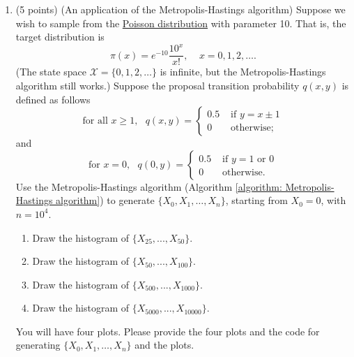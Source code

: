 \documentclass[11pt,letterpaper, leqno]{article}
\numberwithin{equation}{section}
\numberwithin{theorem}{section}
\numberwithin{lemma}{section}
\numberwithin{corollary}{section}
\numberwithin{definition}{section}
\numberwithin{proposition}{section}
\numberwithin{remark}{section}
\numberwithin{example}{section}
\begin{document}
\begin{enumerate}

\item (5 points) (An application of the Metropolis-Hastings algorithm) Suppose we wish to sample from the \href{https://en.wikipedia.org/wiki/Poisson_distribution}{Poisson distribution} with parameter 10. That is, the target distribution is
 $$
\pi(x) = e^{-10} \frac{10^x}{x!},~~~~~x=0,1,2,\ldots.
$$
(The state space $\mathcal{X}=\{0,1,2,\ldots\}$ is infinite, but the Metropolis-Hastings algorithm still works.) Suppose the proposal transition
probability $q(x,y)$ is defined as follows
$$
\mbox{for all }x\ge1,\ \ \ q(x,y) = \left\{\begin{array}{cl}  0.5 &  \mbox{ if }y = x \pm 1\\ 
0 & \mbox{ otherwise;}\end{array}\right.
$$
and
$$
\mbox{for }x=0,\ \ \ q(0,y) = \left\{\begin{array}{cl}  0.5 &  \mbox{ if }y = 1 \mbox{ or } 0\\ 
0 & \mbox{ otherwise.}\end{array}\right.
$$
Use the Metropolis-Hastings algorithm (Algorithm \ref{algorithm: Metropolis-Hastings algorithm}) to generate $\{X_0,X_1, \ldots,X_n\}$,
starting from $X_0 = 0$, with $n = 10^4$. 

\begin{enumerate}
    \item Draw the histogram of $\{X_{25}, . . . ,X_{50}\}$.
    \item Draw the histogram of $\{X_{50}, . . . ,X_{100}\}$.
    \item Draw the histogram of $\{X_{500}, . . . ,X_{1000}\}$.
    \item Draw the histogram of $\{X_{5000}, . . . ,X_{10000}\}$.
\end{enumerate}

You will have four plots. Please provide the four plots and the code for generating $\{X_0,X_1, \ldots,X_n\}$ and the plots.


\end{enumerate}
\end{document}
